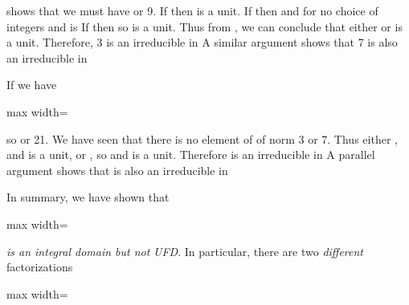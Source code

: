 \documentclass[11pt,oneside]{article}
\begin{document}
\begin{BookBody}
\noindent shows that we must have  or 9. If  then \BookInline{\alpha } is a unit. If   then  and for no choice of integers  and  is  If  then  so \BookInline{\beta } is a unit. Thus from , we can conclude that either \BookInline{\alpha } or \BookInline{\beta } is a unit. Therefore, 3 is an irreducible in  A similar argument shows that 7 is also an irreducible in 

If  we have

\begin{center}\begin{adjustbox}{max width=\linewidth}\end{adjustbox}\end{center}

so  or 21. We have seen that there is no element of  of norm 3 or 7. Thus either , and \BookInline{\gamma } is a unit, or , so  and \BookInline{\delta } is a unit. Therefore is an irreducible in  A parallel argument shows that  is also an irreducible in 

In summary, we have shown that

\begin{center}\begin{adjustbox}{max width=\linewidth}\end{adjustbox}\end{center}

\noindent \textit{is an integral domain but not}  \textit{UFD}. In particular, there are two\textit{ different} factorizations

\begin{center}\begin{adjustbox}{max width=\linewidth}\end{adjustbox}\end{center}


\end{BookBody}
\end{document}
